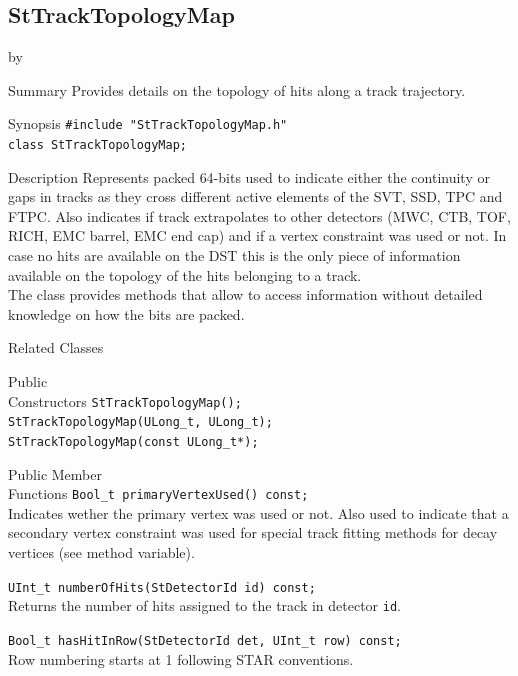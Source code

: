 \documentclass[twoside]{article}
\newcommand{\entrylabel}[1]{\mbox{\textbf{{#1}}}\hfil}%
\newenvironment{entry}
{\begin{list}{}%
    {\renewcommand{\makelabel}{\entrylabel}%
     \setlength{\labelwidth}{90pt}%
     \setlength{\leftmargin}{\labelwidth}
     \advance\leftmargin by \labelsep%
      }%
    }%
  {\end{list}}
\newcommand{\Entrylabel}[1]%
{\raisebox{0pt}[1ex][0pt]{\makebox[\labelwidth][l]%
    {\parbox[t]{\labelwidth}{\hspace{0pt}\textbf{{#1}}}}}}
\newenvironment{Entry}%
{\renewcommand{\entrylabel}{\Entrylabel}\begin{entry}}%
  {\end{entry}}
\begin{document}
\subsection{StTrackTopologyMap}
\label{sec:StTrackTopologyMap}
\begin{Entry}
\item[Summary] Provides details on the topology of hits along a track trajectory.
\item[Synopsis]
    \verb+#include "StTrackTopologyMap.h"+\\
    \verb+class StTrackTopologyMap;+\\
\item[Description]
    Represents packed 64-bits used to indicate either
    the continuity or gaps in tracks as they cross different active
    elements of the SVT, SSD, TPC and FTPC.  Also indicates if track
    extrapolates to other detectors (MWC, CTB, TOF, RICH, EMC barrel,
    EMC end cap) and if a vertex constraint was used or not.
    In case no hits are available on the DST this is the only piece
    of information available on the topology of the hits belonging
    to a track.\\
    The class provides methods that allow to access information without
    detailed knowledge on how the bits are packed.   

\item[Related Classes]
\item[Public\\ Constructors]
    \verb+StTrackTopologyMap();+\\
    \verb+StTrackTopologyMap(ULong_t, ULong_t);+\\
    \verb+StTrackTopologyMap(const ULong_t*);+\\
    
\item[Public Member\\ Functions]
    \verb+Bool_t primaryVertexUsed() const;+\\
    Indicates wether the primary vertex was used or not.  Also used to
    indicate that a secondary vertex constraint was used for special
    track fitting methods for decay vertices (see method variable).

    \verb+UInt_t numberOfHits(StDetectorId id) const;+\\
    Returns the number of hits assigned to the track in detector \texttt{id}.
    
    \verb+Bool_t hasHitInRow(StDetectorId det, UInt_t row) const;+\\
    Row numbering starts at 1 following STAR conventions.
    

\end{Entry}
\end{document}
